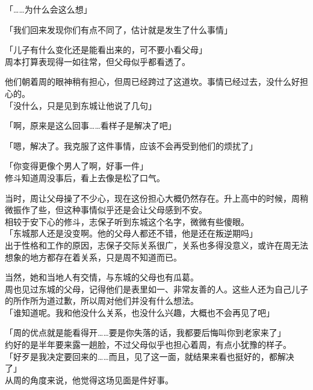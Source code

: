 「……为什么会这么想」

「我们回来发现你们有点不同了，估计就是发生了什么事情」

「儿子有什么变化还是能看出来的，可不要小看父母」\\

周本打算表现得一如往常，但父母似乎都看透了。

他们朝着周的眼神稍有担心，但周已经跨过了这道坎。事情已经过去，没什么好担心的。\\

「没什么，只是见到东城让他说了几句」

「啊，原来是这么回事……看样子是解决了吧」

「嗯，解决了。我克服了这件事情，应该不会再受到他们的烦扰了」

「你变得更像个男人了啊，好事一件」\\

修斗知道周没事后，看上去像是松了口气。

当时，周让父母操了不少心，现在这份担心大概仍然存在。升上高中的时候，周稍微振作了些，但这种事情似乎还是会让父母感到不安。\\

相较于安下心的修斗，志保子听到东城这个名字，微微有些傻眼。\\

「东城那人还是没变啊。他的父母人都还不错，他是还在叛逆期吗」\\

出于性格和工作的原因，志保子交际关系很广，关系也多得没意义，或许在周无法想象的地方都存在着关系，只是周不知道而已。

当然，她和当地人有交情，与东城的父母也有瓜葛。\\

周也见过东城的父母，记得他们是表里如一、非常友善的人。这些人还为自己儿子的所作所为道过歉，所以周对他们并没有什么想法。\\

「谁知道呢。我和他没什么关系，也没什么兴趣，大概也不会再见了吧」

「周的优点就是能看得开……要是你失落的话，我都要后悔叫你到老家来了」\\

约好的是半年要来露一趟脸，不过父母似乎也担心着周，有点小犹豫的样子。\\

「好歹是我决定要回来的……而且，见了这一面，就结果来看也挺好的，都解决了」\\

从周的角度来说，他觉得这场见面是件好事。

